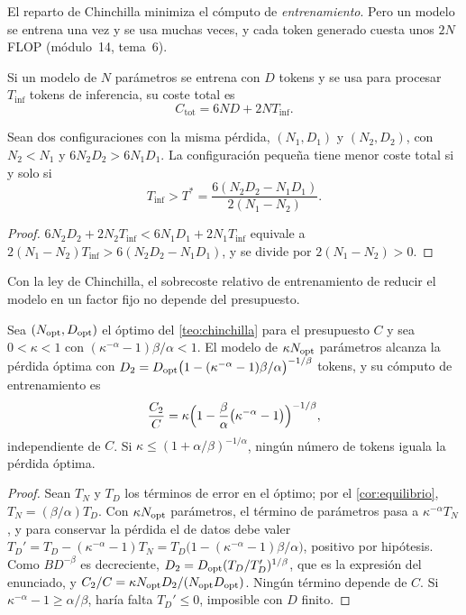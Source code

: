 El reparto de Chinchilla minimiza el cómputo de \emph{entrenamiento}. Pero un modelo se entrena una vez y se usa muchas veces, y cada token generado cuesta unos $2N$ FLOP (módulo~14, tema~6).

\begin{definicion}
Si un modelo de $N$ parámetros se entrena con $D$ tokens y se usa para procesar $T_{\mathrm{inf}}$ tokens de inferencia, su coste total es
\[
C_{\mathrm{tot}}=6ND+2NT_{\mathrm{inf}}.
\]
\end{definicion}

\begin{proposicion}\label{prop:amortizacion}
Sean dos configuraciones con la misma pérdida, $(N_1,D_1)$ y $(N_2,D_2)$, con $N_2<N_1$ y $6N_2D_2>6N_1D_1$. La configuración pequeña tiene menor coste total si y solo si
\[
T_{\mathrm{inf}}>T^{*}=\frac{6(N_2D_2-N_1D_1)}{2(N_1-N_2)}.
\]
\end{proposicion}

\begin{proof}
$6N_2D_2+2N_2T_{\mathrm{inf}}<6N_1D_1+2N_1T_{\mathrm{inf}}$ equivale a $2(N_1-N_2)T_{\mathrm{inf}}>6(N_2D_2-N_1D_1)$, y se divide por $2(N_1-N_2)>0$.
\end{proof}

Con la ley de Chinchilla, el sobrecoste relativo de entrenamiento de reducir el modelo en un factor fijo no depende del presupuesto.

\begin{proposicion}\label{prop:sobrecoste}
Sea $(N_{\mathrm{opt}},D_{\mathrm{opt}})$ el óptimo del \cref{teo:chinchilla} para el presupuesto $C$ y sea $0<\kappa<1$ con $(\kappa^{-\alpha}-1)\beta/\alpha<1$. El modelo de $\kappa N_{\mathrm{opt}}$ parámetros alcanza la pérdida óptima con $D_2=D_{\mathrm{opt}}\bigl(1-(\kappa^{-\alpha}-1)\beta/\alpha\bigr)^{-1/\beta}$ tokens, y su cómputo de entrenamiento es
\[
\frac{C_2}{C}=\kappa\Bigl(1-\frac{\beta}{\alpha}\bigl(\kappa^{-\alpha}-1\bigr)\Bigr)^{-1/\beta},
\]
independiente de $C$. Si $\kappa\le(1+\alpha/\beta)^{-1/\alpha}$, ningún número de tokens iguala la pérdida óptima.
\end{proposicion}

\begin{proof}
Sean $T_N$ y $T_D$ los términos de error en el óptimo; por el \cref{cor:equilibrio}, $T_N=(\beta/\alpha)T_D$. Con $\kappa N_{\mathrm{opt}}$ parámetros, el término de parámetros pasa a $\kappa^{-\alpha}T_N$, y para conservar la pérdida el de datos debe valer $T_D'=T_D-(\kappa^{-\alpha}-1)T_N=T_D\bigl(1-(\kappa^{-\alpha}-1)\beta/\alpha\bigr)$, positivo por hipótesis. Como $B D^{-\beta}$ es decreciente, $D_2=D_{\mathrm{opt}}(T_D/T_D')^{1/\beta}$, que es la expresión del enunciado, y $C_2/C=\kappa N_{\mathrm{opt}} D_2/(N_{\mathrm{opt}}D_{\mathrm{opt}})$. Ningún término depende de $C$. Si $\kappa^{-\alpha}-1\ge\alpha/\beta$, haría falta $T_D'\le 0$, imposible con $D$ finito.
\end{proof}

